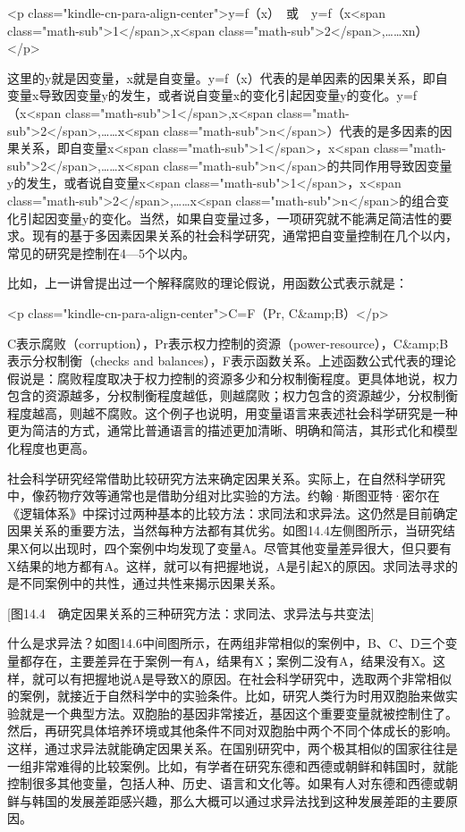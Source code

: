 <p class="kindle-cn-para-align-center">y=f（x）　或　y=f（x<span class="math-sub">1</span>,x<span class="math-sub">2</span>,……xn）</p>

这里的y就是因变量，x就是自变量。y=f（x）代表的是单因素的因果关系，即自变量x导致因变量y的发生，或者说自变量x的变化引起因变量y的变化。y=f（x<span class="math-sub">1</span>,x<span class="math-sub">2</span>,……x<span class="math-sub">n</span>）代表的是多因素的因果关系，即自变量x<span class="math-sub">1</span>，x<span class="math-sub">2</span>,……x<span class="math-sub">n</span>的共同作用导致因变量y的发生，或者说自变量x<span class="math-sub">1</span>，x<span class="math-sub">2</span>,……x<span class="math-sub">n</span>的组合变化引起因变量y的变化。当然，如果自变量过多，一项研究就不能满足简洁性的要求。现有的基于多因素因果关系的社会科学研究，通常把自变量控制在几个以内，常见的研究是控制在4—5个以内。

比如，上一讲曾提出过一个解释腐败的理论假说，用函数公式表示就是：

<p class="kindle-cn-para-align-center">C=F（Pr, C&amp;B）</p>

C表示腐败（corruption），Pr表示权力控制的资源（power-resource），C&amp;B表示分权制衡（checks and balances），F表示函数关系。上述函数公式代表的理论假说是：腐败程度取决于权力控制的资源多少和分权制衡程度。更具体地说，权力包含的资源越多，分权制衡程度越低，则越腐败；权力包含的资源越少，分权制衡程度越高，则越不腐败。这个例子也说明，用变量语言来表述社会科学研究是一种更为简洁的方式，通常比普通语言的描述更加清晰、明确和简洁，其形式化和模型化程度也更高。


社会科学研究经常借助比较研究方法来确定因果关系。实际上，在自然科学研究中，像药物疗效等通常也是借助分组对比实验的方法。约翰·斯图亚特·密尔在《逻辑体系》中探讨过两种基本的比较方法：求同法和求异法。这仍然是目前确定因果关系的重要方法，当然每种方法都有其优劣。如图14.4左侧图所示，当研究结果X何以出现时，四个案例中均发现了变量A。尽管其他变量差异很大，但只要有X结果的地方都有A。这样，就可以有把握地说，A是引起X的原因。求同法寻求的是不同案例中的共性，通过共性来揭示因果关系。

[图14.4　确定因果关系的三种研究方法：求同法、求异法与共变法]

什么是求异法？如图14.6中间图所示，在两组非常相似的案例中，B、C、D三个变量都存在，主要差异在于案例一有A，结果有X；案例二没有A，结果没有X。这样，就可以有把握地说A是导致X的原因。在社会科学研究中，选取两个非常相似的案例，就接近于自然科学中的实验条件。比如，研究人类行为时用双胞胎来做实验就是一个典型方法。双胞胎的基因非常接近，基因这个重要变量就被控制住了。然后，再研究具体培养环境或其他条件不同对双胞胎中两个不同个体成长的影响。这样，通过求异法就能确定因果关系。在国别研究中，两个极其相似的国家往往是一组非常难得的比较案例。比如，有学者在研究东德和西德或朝鲜和韩国时，就能控制很多其他变量，包括人种、历史、语言和文化等。如果有人对东德和西德或朝鲜与韩国的发展差距感兴趣，那么大概可以通过求异法找到这种发展差距的主要原因。

